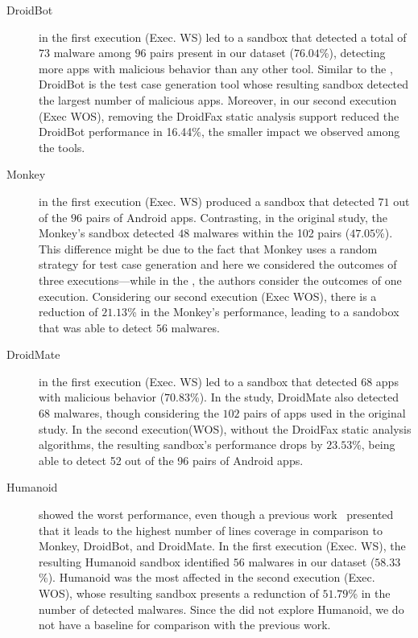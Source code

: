\begin{description}
\item[DroidBot] in the first execution (Exec. WS) led to a sandbox that detected a total of $73$ malware among $96$ pairs present in our dataset ($76.04$\%),
  detecting more apps with malicious behavior than any other tool. Similar to the \blls, DroidBot is the test case generation tool
  whose resulting sandbox detected the largest number of malicious apps. Moreover, in our second execution (Exec WOS), removing the DroidFax
  static analysis support reduced the DroidBot performance in 16.44\%, the smaller impact we observed among the tools.

  \item[Monkey] in the first execution (Exec. WS) produced a sandbox that detected $71$ out of the $96$ pairs of Android apps.
    Contrasting, in the original study, the Monkey's sandbox detected $48$ malwares within the 102 pairs ($47.05$\%). This difference
    might be due to the fact that Monkey uses a random strategy for test case generation and here we considered the outcomes
    of three executions---while in the \blls, the authors consider the outcomes of one execution. 
    Considering our second execution (Exec WOS), there is a reduction of $21.13$\% in the Monkey's performance, leading to
    a sandobox that was able to detect $56$ malwares. 

  \item[DroidMate] in the first execution (Exec. WS) led to a sandbox that detected 68 apps with malicious behavior ($70.83$\%).
    In the \blls study, DroidMate also detected $68$ malwares, though considering the $102$ pairs of apps used in the
    original study. In the second execution(WOS),
    without the DroidFax static analysis algorithms, the resulting sandbox's performance drops by $23.53$\%, being able to detect
    52 out of the 96 pairs of Android apps.
    
  \item[Humanoid] showed the worst performance, even though a previous work~\cite{DBLP:conf/kbse/LiY0C19} presented that it leads to
    the highest number of lines coverage in comparison to Monkey, DroidBot, and DroidMate. In the first execution (Exec. WS),
    the resulting Humanoid sandbox identified $56$ malwares in our dataset ($58.33$\%). Humanoid was the most affected in the second
    execution (Exec. WOS), whose resulting sandbox presents a redunction of $51.79$\%  in the number of detected malwares.
    Since the \blls did not explore Humanoid,
    we do not have a baseline for comparison with the previous work.


\end{description}
